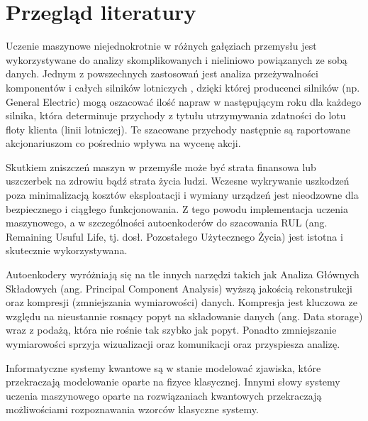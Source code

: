 \newpage
\section{Przegląd literatury}
Uczenie maszynowe niejednokrotnie w różnych gałęziach przemysłu jest wykorzystywane do analizy skomplikowanych i nieliniowo powiązanych ze sobą danych. \cite{review_predictive_maintenance_2023} Jednym z powszechnych zastosowań jest analiza przeżywalności komponentów i całych silników lotniczych \cite{saxena2008damage}, dzięki której producenci silników (np. General Electric) mogą oszacować ilość napraw w następującym roku dla każdego silnika, która determinuje przychody z tytułu utrzymywania zdatności do lotu floty klienta (linii lotniczej). Te szacowane przychody następnie są raportowane akcjonariuszom co pośrednio wpływa na wycenę akcji. 

Skutkiem zniszczeń maszyn w przemyśle może być strata finansowa lub uszczerbek na zdrowiu bądź strata życia ludzi. Wczesne wykrywanie uszkodzeń poza minimalizacją kosztów eksploatacji i wymiany urządzeń jest nieodzowne dla bezpiecznego i ciągłego funkcjonowania. Z tego powodu implementacja uczenia maszynowego, a w szczególności autoenkoderów do szacowania RUL (ang. Remaining Usuful Life, tj. dosł. Pozostałego Użytecznego Życia) jest istotna i skutecznie wykorzystywana. \cite{autoencoder_fault_detection_2022}

Autoenkodery wyróżniają się na tle innych narzędzi takich jak Analiza Głównych Składowych (ang. Principal Component Analysis) wyższą jakością rekonstrukcji oraz kompresji (zmniejszania wymiarowości) danych. Kompresja jest kluczowa ze względu na nieustannie rosnący popyt na składowanie danych (ang. Data storage) wraz z podażą, która nie rośnie tak szybko jak popyt. Ponadto zmniejszanie wymiarowości sprzyja wizualizacji oraz komunikacji oraz przyspiesza analizę. \cite{hinton2006reducing}

Informatyczne systemy kwantowe są w stanie modelować zjawiska, które przekraczają modelowanie oparte na fizyce klasycznej. Innymi słowy systemy uczenia maszynowego oparte na rozwiązaniach kwantowych przekraczają możliwościami rozpoznawania wzorców klasyczne systemy. \cite{romero2017quantum}